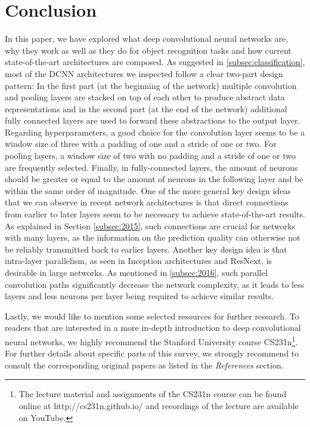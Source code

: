 \documentclass[conference]{IEEEtran}
\begin{document}
\section{Conclusion}\label{sec:conclusion}
In this paper, we have explored what deep convolutional neural networks are, why they work as well as they do for object recognition tasks and how current state-of-the-art architectures are composed. As suggested in \ref{subsec:classification}, most of the DCNN architectures we inspected follow a clear two-part design pattern: In the first part (at the beginning of the network) multiple convolution and pooling layers are stacked on top of each other to produce abstract data representations and in the second part (at the end of the network) additional fully connected layers are used to forward these abstractions to the output layer. Regarding hyperparameters, a good choice for the convolution layer seems to be a window size of three with a padding of one and a stride of one or two. For pooling layers, a window size of two with no padding and a stride of one or two are frequently selected. Finally, in fully-connected layers, the amount of neurons should be greater or equal to the amount of neurons in the following layer and be within the same order of magnitude. One of the more general key design ideas that we can observe in recent network architectures is that direct connections from earlier to later layers seem to be necessary to achieve state-of-the-art results. As explained in Section \ref{subsec:2015}, such connections are crucial for networks with many layers, as the information on the prediction quality can otherwise not be reliably transmitted back to earlier layers. Another key design idea is that intra-layer parallelism, as seen in Inception architectures and ResNext, is desirable in large networks. As mentioned in \ref{subsec:2016}, such parallel convolution paths significantly decrease the network complexity, as it leads to less layers and less neurons per layer being required to achieve similar results.

Lastly, we would like to mention some selected resources for further research. To readers that are interested in a more in-depth introduction to deep convolutional neural networks, we highly recommend the Stanford University course CS231n\footnote{The lecture material and assignments of the CS231n course can be found online at http://cs231n.github.io/ and recordings of the lecture are available on YouTube.}. For further details about specific parts of this survey, we strongly recommend to consult the corresponding original papers as listed in the \emph{References} section.
\end{document}
